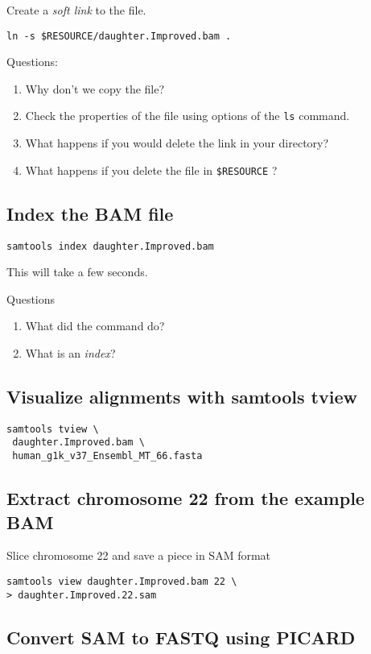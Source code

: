\documentclass{article}
\begin{document}
Create a {\em soft link} to the file.

\begin{verbatim}
ln -s $RESOURCE/daughter.Improved.bam .
\end{verbatim}
Questions:
\begin{enumerate}
\item Why don't we copy the file? 
\item Check the properties of the file using options of the \verb+ls+ command.
\item What happens if you would delete the link in your directory?
\item What happens if you delete the file in \verb|$RESOURCE| ?
\end{enumerate}
\subsection{Index the BAM file}
\begin{verbatim}
samtools index daughter.Improved.bam
\end{verbatim}
This will take a few seconds. 

Questions
\begin{enumerate}
\item  What did the command do? 
\item What is an {\em index}?
\end{enumerate}
\subsection{Visualize alignments with samtools tview }
\begin{verbatim}
samtools tview \
 daughter.Improved.bam \
 human_g1k_v37_Ensembl_MT_66.fasta
\end{verbatim}

\subsection{Extract chromosome 22 from the example BAM}
Slice chromosome 22 and save a piece in SAM format
\begin{verbatim}
samtools view daughter.Improved.bam 22 \
> daughter.Improved.22.sam
\end{verbatim}

\subsection{Convert SAM to FASTQ using PICARD}
\end{document}
